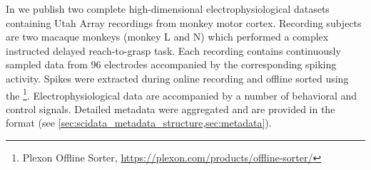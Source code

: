 % 

In \citet{Brochier_2018} we publish two complete high-dimensional electrophysiological datasets containing Utah Array recordings from monkey motor cortex. Recording subjects are two macaque monkeys (monkey L and N) which performed a complex instructed delayed reach-to-grasp task. Each recording contains continuously sampled data from 96 electrodes accompanied by the corresponding spiking activity. Spikes were extracted during online recording and offline sorted using the \footnote{Plexon Offline Sorter, \url{https://plexon.com/products/offline-sorter/}}. Electrophysiological data are accompanied by a number of behavioral and control signals. Detailed metadata were aggregated and are provided in the  format (see \cref{sec:scidata_metadata_structure,sec:metadata}).

